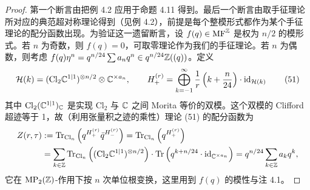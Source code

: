 
\begin{proof}
第一个断言由把例 4.2 应用于命题 4.11 得到。最后一个断言由取手征理论所对应的典范超对称理论得到（见例 4.2），前提是每个整模形式都作为某个手征理论的配分函数出现。为验证这一遗留断言，设 $f(q)\in\mathrm{MF}^{\mathbb{Z}}$ 是权为 $n/2$ 的模形式。若 $n$ 为奇数，则 $f(q)=0$，可取零理论作为我们的手征理论。若 $n$ 为偶数，则考虑 $f(q)\eta^n=q^{n/24}\sum a_nq^n\in q^{n/24}\mathbb{Z}((q))$。定义
\begin{equation}
\mathcal{H}(k)=(\mathrm{Cl}_2\mathbb{C}^{1|1})^{\otimes n/2}\otimes\mathbb{C}^{\times a_n},
\qquad
H^{(r)}_+=\bigoplus_{k=-1}^{\infty}\frac{1}{r}\left(k+\frac{n}{24}\right)\cdot\operatorname{id}_{\mathcal{H}(k)}
\tag{51}
\end{equation}
其中 $\mathrm{Cl}_2(\mathbb{C}^{1|1})_{\mathbb{C}}$ 是实现 $\mathrm{Cl}_2$ 与 $\mathbb{C}$ 之间 Morita 等价的双模。这个双模的 Clifford 超迹等于 1，故（利用张量积之迹的乘性）理论 (51) 的配分函数为
\[
\begin{aligned}
Z(r,\tau)
&:=\operatorname{Tr}_{\mathrm{Cl}_n}\left(q^{H^{(r)}_+}\bar q^{H^{(r)}_-}\right)
=\operatorname{Tr}_{\mathrm{Cl}_n}\left(q^{H^{(r)}_+}\right)\\
&=\sum_{k\in\mathbb{Z}}\operatorname{Tr}_{\mathrm{Cl}_n}\left((\mathrm{Cl}_2\mathbb{C}^{1|1})^{\otimes n/2}\right)\cdot\operatorname{Tr}\left(q^{k+n/24}\cdot\operatorname{id}_{\mathbb{C}^{\times a_n}}\right)
=q^{n/24}\sum_{k\in\mathbb{Z}}a_kq^k,
\end{aligned}
\]
它在 $\operatorname{MP}_2(\mathbb{Z})$-作用下按 $n$ 次单位根变换，这里用到 $f(q)$ 的模性与注 4.1。
\end{proof}

